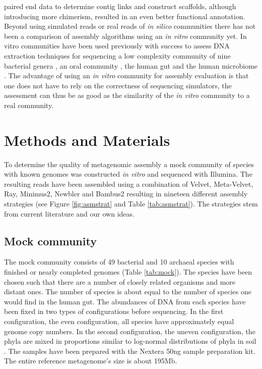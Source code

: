 \documentclass[a4paper,12pt]{report}
\begin{document}
paired end data to determine contig links and construct scaffolds, although
introducing more chimerism, resulted in an even better functional annotation.
Beyond using simulated reads or real reads of {\em in silico} communities
there has not been a comparison of assembly algorithms using an {\em in vitro}
community yet.  In vitro communities have been used previously with success to
assess DNA extraction techniques for sequencing a low complexity community of
nine bacterial genera \cite{Willner22514642}, an oral community
\cite{Diaz22520388}, the human gut \cite{Wu20673359} and the human microbiome
\cite{HMPC22699610}.  The advantage of using an {\em in vitro} community for
assembly evaluation is that one does not have to rely on the correctness of
sequencing simulators, the assessment can thus be as good as the similarity of
the {\em in vitro } community to a real community.


\chapter{Methods and Materials} To determine the quality of metagenomic assembly a mock
community of species with known genomes was constructed {\em in vitro} and
sequenced with Illumina. The resulting reads have been assembled using a
combination of Velvet, Meta-Velvet, Ray, Minimus2, Newbler and Bambus2 resulting in
nineteen different assembly strategies (see Figure \ref{fig:asmstrat} and Table
\ref{tab:asmstrat}). The strategies stem from current literature and our own
ideas.

\section{Mock community} The mock community consists of 49 bacterial and 10
archaeal species with finished or nearly completed genomes (Table
\ref{tab:mock}). The species have been chosen such that there are a number of
closely related organisms and more distant ones. The number of species is about
equal to the number of species one would find in the human gut. The abundances
of DNA from each species have been fixed in two types of configurations before
sequencing. In the first configuration, the even configuration, all species
have approximately equal genome copy numbers. In the second configuration, the
uneven configuration, the phyla are mixed in proportions similar to log-normal
distributions of phyla in soil \cite{Doroghazi18682841}. The samples have been
prepared with the Nextera 50ng sample preparation kit. The entire reference
metagenome's size is about 195Mb. 
\end{document}
